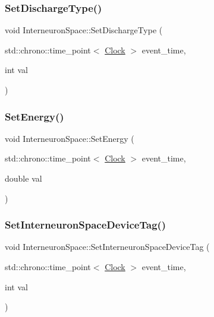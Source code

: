 \subsubsection{\texorpdfstring{Set\+Discharge\+Type()}{SetDischargeType()}}
{\footnotesize\ttfamily void Interneuron\+Space\+::\+Set\+Discharge\+Type (\begin{DoxyParamCaption}\item[{std\+::chrono\+::time\+\_\+point$<$ \mbox{\hyperlink{universe_8h_a0ef8d951d1ca5ab3cfaf7ab4c7a6fd80}{Clock}} $>$}]{event\+\_\+time,  }\item[{int}]{val }\end{DoxyParamCaption})\hspace{0.3cm}{\ttfamily [inline]}}

\mbox{\label{classInterneuronSpace_a65ecd1914ab039707313beb1b8702e68}} 
\subsubsection{\texorpdfstring{Set\+Energy()}{SetEnergy()}}
{\footnotesize\ttfamily void Interneuron\+Space\+::\+Set\+Energy (\begin{DoxyParamCaption}\item[{std\+::chrono\+::time\+\_\+point$<$ \mbox{\hyperlink{universe_8h_a0ef8d951d1ca5ab3cfaf7ab4c7a6fd80}{Clock}} $>$}]{event\+\_\+time,  }\item[{double}]{val }\end{DoxyParamCaption})\hspace{0.3cm}{\ttfamily [inline]}}

\mbox{\label{classInterneuronSpace_ab34d72ef9135288690328217d7c0a388}} 
\subsubsection{\texorpdfstring{Set\+Interneuron\+Space\+Device\+Tag()}{SetInterneuronSpaceDeviceTag()}}
{\footnotesize\ttfamily void Interneuron\+Space\+::\+Set\+Interneuron\+Space\+Device\+Tag (\begin{DoxyParamCaption}\item[{std\+::chrono\+::time\+\_\+point$<$ \mbox{\hyperlink{universe_8h_a0ef8d951d1ca5ab3cfaf7ab4c7a6fd80}{Clock}} $>$}]{event\+\_\+time,  }\item[{int}]{val }\end{DoxyParamCaption})\hspace{0.3cm}{\ttfamily [inline]}}


